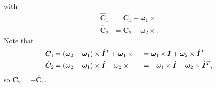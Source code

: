 \documentclass[10pt,dvips,fleqn,subeqn]{report}
\newcommand{\T}[1]{\bm{#1}}
\newcommand{\TT}[1]{\bm{#1}}
\begin{document}
with
\begin{subequations}
\begin{align}
	\hat{\TT{C}}_1 &= \TT{C}_1 + \T{\omega}_1\times{}
	\\
	\hat{\TT{C}}_2 &= \TT{C}_2 - \T{\omega}_2\times{}
	.
\end{align}
\end{subequations}
Note that
\begin{subequations}
\begin{align}
	\hat{\TT{C}}_1
	&= \plbr{\T{\omega}_2 - \T{\omega}_1}\times\hat{\TT{I}}^T
	+ \T{\omega}_1\times{}
	&&= \T{\omega}_1 \times\hat{\TT{I}}
		+ \T{\omega}_2 \times\hat{\TT{I}}^T
	\\
	\hat{\TT{C}}_2
	&= \plbr{\T{\omega}_2 - \T{\omega}_1}\times\hat{\TT{I}}
	- \T{\omega}_2\times{}
	&&= - \T{\omega}_1 \times\hat{\TT{I}}
		- \T{\omega}_2 \times\hat{\TT{I}}^T
	,
\end{align}
\end{subequations}
so $\hat{\TT{C}}_2 = - \hat{\TT{C}}_1$.
\end{document}
